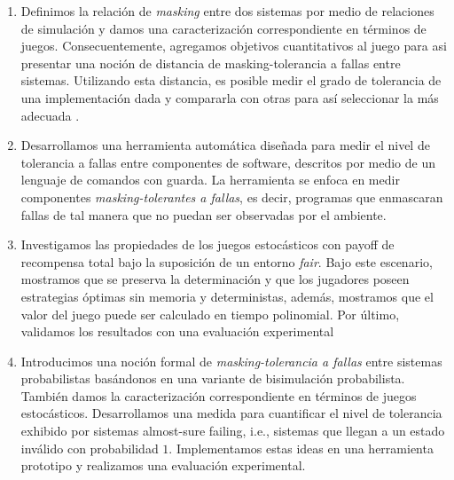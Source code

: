 \begin{enumerate}
	
\item Definimos la relación de \textit{masking} entre dos sistemas por medio de relaciones de simulación y damos una caracterización correspondiente en términos de juegos. Consecuentemente, agregamos objetivos cuantitativos al juego para asi presentar una noción de distancia de masking-tolerancia a fallas entre sistemas. 
Utilizando esta distancia, es posible medir el grado de tolerancia de una implementación dada y compararla con otras para así seleccionar la más adecuada \cite{CastroDDP18b}.
	
\item Desarrollamos una herramienta automática diseñada para medir el nivel de tolerancia a fallas entre componentes de software, descritos por medio de un lenguaje de comandos con guarda. La herramienta se enfoca en medir componentes \textit{masking-tolerantes a fallas}, es decir, programas que enmascaran fallas de tal manera que no puedan ser observadas por el ambiente\cite{PutrueleDCD22}. 

\item Investigamos las propiedades de los juegos estocásticos con payoff de recompensa total bajo la suposición de un entorno \textit{fair}. Bajo este escenario, mostramos que se preserva la determinación y que los jugadores poseen estrategias óptimas sin memoria y deterministas, además, mostramos que el valor del juego puede  ser calculado en tiempo polinomial. Por último, validamos los resultados con una evaluación experimental \cite{CastroDDP22}

\item Introducimos una noción formal de \textit{masking-tolerancia a fallas} entre sistemas probabilistas basándonos en una variante de bisimulación probabilista. También damos la caracterización correspondiente en términos de juegos estocásticos. Desarrollamos una medida para cuantificar el nivel de tolerancia exhibido por sistemas almost-sure failing, i.e., sistemas que llegan a un estado inválido con probabilidad $1$.  Implementamos estas ideas en una herramienta prototipo y realizamos una evaluación experimental. \cite{DBLP:journals/corr/abs-2207-02045}
 
\end{enumerate}

